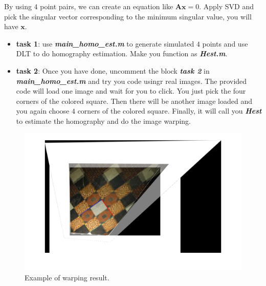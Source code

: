 \documentclass[a4paper]{article}
\begin{document}
By using $4$ point pairs, we can create an equation like $\mathbf{Ax}=0$. Apply SVD and pick the singular vector corresponding to the minimum singular value, you will have $\mathbf{x}$.


\begin{itemize}
\item \textbf{task 1}: use \textbf{\textit{main\_homo\_est.m}} to generate simulated $4$ points and use DLT to do homography estimation. Make you function as \textbf{\textit{Hest.m}}.
\item \textbf{task 2}: Once you have done, uncomment the block \textbf{\textit{task 2}} in \textbf{\textit{main\_homo\_est.m}} and try you code usingr real images. The provided code will load one image and wait for you to click. You just pick the four corners of the colored square. Then there will be another image loaded and you again choose $4$ corners of the colored square. Finally, it will call you \textbf{\textit{Hest}} to estimate the homography and do the image warping.
\end{itemize}

\begin{figure}[!b]
\centering
\includegraphics[scale=0.4]{figures/hest.png}
\caption{Example of warping result.}
\end{figure}
\end{document}
